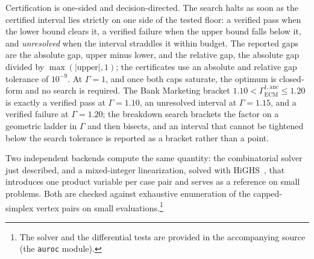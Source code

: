 \documentclass[11pt]{article}
\theoremstyle{remark}
\begin{document}
Certification is one-sided and decision-directed. The search halts as soon as
the certified interval lies strictly on one side of the tested floor: a verified
pass when the lower bound clears it, a verified failure when the upper bound
falls below it, and \emph{unresolved} when the interval straddles it within
budget. The reported gaps are the absolute gap, upper minus lower, and the
relative gap, the absolute gap divided by $\max(|\text{upper}|,1)$; the
certificates use an absolute and relative gap tolerance of $10^{-9}$. At
$\Gamma=1$, and once both caps saturate, the optimum is closed-form and no
search is required. The Bank Marketing bracket
$1.10<\Gamma_{\mathrm{ECM}}^{\dagger,\mathrm{anc}}\leq1.20$ is exactly a verified
pass at $\Gamma=1.10$, an unresolved interval at $\Gamma=1.15$, and a verified
failure at $\Gamma=1.20$; the breakdown search brackets the factor on a
geometric ladder in $\Gamma$ and then bisects, and an interval that cannot be
tightened below the search tolerance is reported as a bracket rather than a
point.

Two independent backends compute the same quantity: the combinatorial solver
just described, and a mixed-integer linearization, solved with HiGHS~\cite{huangfu2018highs},
that introduces one product variable per case pair and serves as a reference on
small problems. Both are checked against exhaustive enumeration of
the capped-simplex vertex pairs on small evaluations.\footnote{The solver and
the differential tests are provided in the accompanying source (the
\texttt{auroc} module).}
\end{document}
